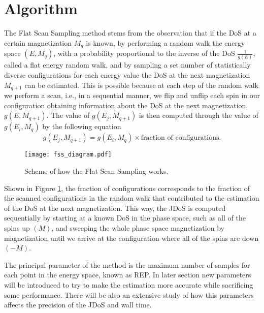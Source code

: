 	\pagebreak

\section{Algorithm}

	The Flat Scan Sampling method stems from the observation that if  the DoS at a certain magnetization $M_q$ is known, by performing a random walk the energy space $(E, M_q)$, with a probability proportional to the inverse of the DoS $\frac{1}{g(E)}$, called a flat energy random walk, and by sampling a set number of statistically diverse configurations for each energy value the DoS at the next magnetization $M_{q+1}$ can be estimated. 
This is possible because at each step of the random walk we perform a scan, i.e., in a sequential manner, we flip and unflip each spin in our configuration obtaining information about the DoS at the next magnetization, $g(E, M_{q+1})$. 
The value of $g(E_j, M_{q+1})$ is then computed through the value of $g(E_i, M_q)$ by the following equation
\begin{equation}\label{eq:FSS_JDoS}
	g(E_j, M_{q+1}) = g(E_i, M_q) \times \text{fraction of configurations}.
\end{equation}

\begin{figure}[h]
	\centering
	\texttt{[image: fss\_diagram.pdf]}
	\caption{Scheme of how the Flat Scan Sampling works.}
	\label{fss_dia}
\end{figure}

Shown in Figure \ref{fss_dia}, the fraction of configurations corresponds to the fraction of the scanned configurations in the random walk that contributed to the estimation of the DoS at the next magnetization. This way, the JDoS is computed sequentially by starting at a known DoS in the phase space, such as all of the spins up $(M)$, and sweeping the whole phase space magnetization by magnetization until we arrive at the configuration where all of the spins are down $(-M)$.

The principal parameter of the method is the maximum number of samples for each point in the energy space, known as REP. In later section new parameters will be introduced to try to make the estimation more accurate while sacrificing some performance.  There will be also an extensive study of how this parameters affects the precision of the JDoS and wall time.

